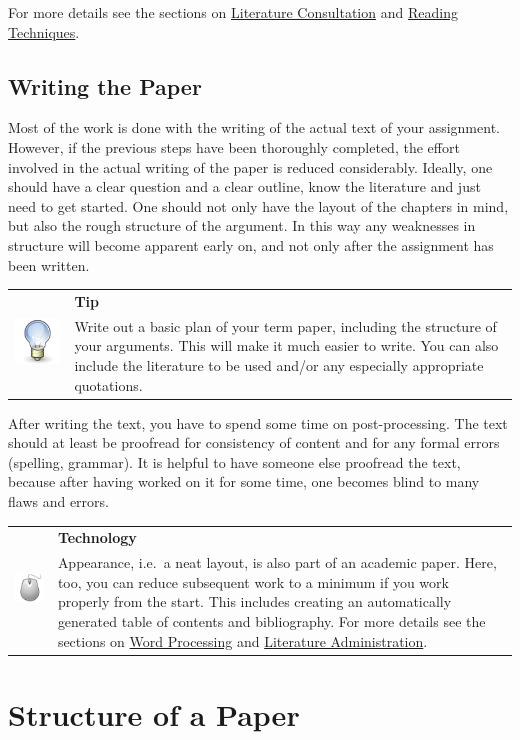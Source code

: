 \documentclass[
  english,
]{scrreprt}
\newlength{\iconwidth}
\newenvironment{displaybox}[2]{%
    \begin{center}
        \setlength\arrayrulewidth{0.75pt}%
        \arrayrulecolor{white}%
        \renewcommand{\arraystretch}{1.3}%
        \begin{tabular}{p{\iconwidth}p{\linewidth-4\tabcolsep-\iconwidth}}
            \multirow{2}{*}{#2}&\cellcolor{boxheadcol}\textbf{\sffamily\color{white}#1} \\%
            \hhline{~-}%
            &\cellcolor{boxcol}%
}{%
            \\
        \end{tabular}
        \arrayrulecolor{black}
    \end{center}
}
\newenvironment{Tip}{%
\begin{displaybox}{Tip}{\includegraphics[width=\iconwidth]{images/icon-tipp}}}%
{\end{displaybox}}
\newenvironment{Technology}{%
\begin{displaybox}{Technology}{\includegraphics[width=\iconwidth]{images/icon-technik}}}%
{\end{displaybox}}
\begin{document}
For more details see the sections on \hyperref[sec:literature_consultation]{Literature Consultation} and \hyperref[sec:reading_techniques]{Reading Techniques}.

\subsection{Writing the Paper}\label{writing-the-paper}

Most of the work is done with the writing of the actual text of your assignment. However, if the previous steps have been thoroughly completed, the effort involved in the actual writing of the paper is reduced considerably. Ideally, one should have a clear question and a clear outline, know the literature and just need to get started. One should not only have the layout of the chapters in mind, but also the rough structure of the argument. In this way any weaknesses in structure will become apparent early on, and not only after the assignment has been written.

\begin{Tip}

Write out a basic plan of your term paper, including the structure of your arguments. This will make it much easier to write. You can also include the literature to be used and/or any especially appropriate quotations.

\end{Tip}

After writing the text, you have to spend some time on post-processing. The text should at least be proofread for consistency of content and for any formal errors (spelling, grammar). It is helpful to have someone else proofread the text, because after having worked on it for some time, one becomes blind to many flaws and errors.

\begin{Technology}

Appearance, i.e.~a neat layout, is also part of an academic paper. Here, too, you can reduce subsequent work to a minimum if you work properly from the start. This includes creating an automatically generated table of contents and bibliography. For more details see the sections on \hyperref[sec:word_processing]{Word Processing} and \hyperref[sec:literature_administration]{Literature Administration}.

\end{Technology}

\section{Structure of a Paper}\label{sec:structure}
\end{document}
